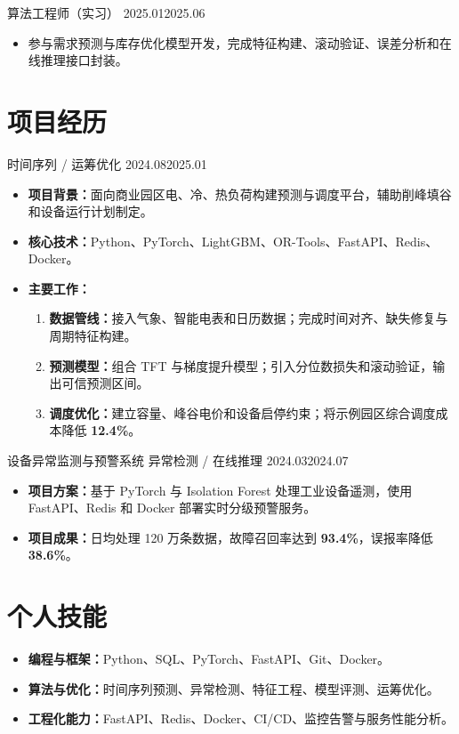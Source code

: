\documentclass{claritycv}
\begin{document}
  {算法工程师（实习）}
  {2025.01}{2025.06}
\begin{itemize}
  \item 参与需求预测与库存优化模型开发，完成特征构建、滚动验证、误差分析和在线推理接口封装。
\end{itemize}

\section{项目经历}

  {时间序列 / 运筹优化}
  {2024.08}{2025.01}
\begin{itemize}
  \item \textbf{项目背景：}面向商业园区电、冷、热负荷构建预测与调度平台，辅助削峰填谷和设备运行计划制定。
  \item \textbf{核心技术：}Python、PyTorch、LightGBM、OR-Tools、FastAPI、Redis、Docker。
  \item \textbf{主要工作：}
    \begin{enumerate}
      \item \textbf{数据管线：}接入气象、智能电表和日历数据；完成时间对齐、缺失修复与周期特征构建。
      \item \textbf{预测模型：}组合 TFT 与梯度提升模型；引入分位数损失和滚动验证，输出可信预测区间。
      \item \textbf{调度优化：}建立容量、峰谷电价和设备启停约束；将示例园区综合调度成本降低 \textcolor{ResumeAccent}{\textbf{12.4\%}}。
    \end{enumerate}
\end{itemize}

\resumeentry
  {设备异常监测与预警系统}
  {异常检测 / 在线推理}
  {2024.03}{2024.07}
\begin{itemize}
  \item \textbf{项目方案：}基于 PyTorch 与 Isolation Forest 处理工业设备遥测，使用 FastAPI、Redis 和 Docker 部署实时分级预警服务。
  \item \textbf{项目成果：}日均处理 120 万条数据，故障召回率达到 \textcolor{ResumeAccent}{\textbf{93.4\%}}，误报率降低 \textcolor{ResumeAccent}{\textbf{38.6\%}}。
\end{itemize}

\section{个人技能}
\begin{itemize}
  \item \textbf{编程与框架：}Python、SQL、PyTorch、FastAPI、Git、Docker。
  \item \textbf{算法与优化：}时间序列预测、异常检测、特征工程、模型评测、运筹优化。
  \item \textbf{工程化能力：}FastAPI、Redis、Docker、CI/CD、监控告警与服务性能分析。
\end{itemize}
\end{document}
